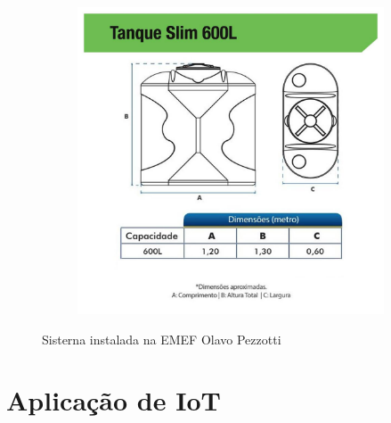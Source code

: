 \documentclass{beamer}
\begin{document}
\begin{frame}
\begin{minipage}{\textwidth}
\begin{figure}
\begin{subfigure}{0.3\textwidth}
		\end{subfigure}
		\quad
		\begin{subfigure}{0.48\textwidth}
			\includegraphics[width=\textwidth]{dimensoes_cisterna.jpg}
		\end{subfigure}
		\caption{Sisterna instalada na EMEF Olavo Pezzotti}
		\label{fig:plfdacddsfa_iot}
		\vspace{-10pt}
	\end{figure}

	
\end{minipage}
\end{frame}

\section{Aplicação de IoT}
\end{document}
